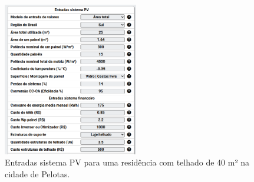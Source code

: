 \documentclass{beamer}
\begin{document}
\begin{frame}


\begin{figure}[H]
    \centering
    \includegraphics[width=0.525\textwidth]{./Figuras/casa_minha_2.png}
    \caption{Entradas sistema PV para uma residência com telhado de 40 m² na cidade de Pelotas.}
   \label{fig:casa_minha_2_1}
\end{figure}

\end{frame}
\end{document}

